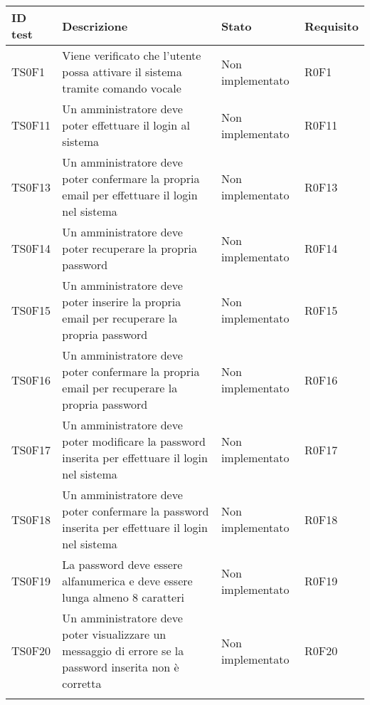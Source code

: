 \documentclass[../PianoDiQualifica.tex]{subfiles}
\begin{document}
	\begin{longtable}[c] { >{\centering\arraybackslash}p{2cm} p{7cm} >{\centering\arraybackslash}p{4cm} >{\centering\arraybackslash}p{2cm}}
		\toprule
		\centerline{\textbf{ID test}} & \centerline{\textbf{Descrizione}} & \centerline{\textbf{Stato}} & \centerline{\textbf{Requisito}}\\
			\midrule
			TS0F1 & Viene verificato che l'utente possa attivare il sistema tramite comando vocale & Non implementato & R0F1 \\ 
			\addlinespace[0.3em]
			\midrule
			\addlinespace[0.3em]
			TS0F11 & Un amministratore deve poter effettuare il login al sistema & Non implementato & R0F11 \\ 
			\addlinespace[0.3em]
			\midrule
			\addlinespace[0.3em]
			TS0F13 & Un amministratore deve poter confermare la propria email per effettuare il login nel sistema & Non implementato & R0F13 \\ 
			\addlinespace[0.3em]
			\midrule
			\addlinespace[0.3em]
			TS0F14 & Un amministratore deve poter recuperare la propria password & Non implementato & R0F14 \\
			\addlinespace[0.3em]
			\midrule
			\addlinespace[0.3em]
			TS0F15 & Un amministratore deve poter inserire la propria email per recuperare la propria password & Non implementato & R0F15 \\ 
			\addlinespace[0.3em]
			\midrule
			\addlinespace[0.3em]
			TS0F16 & Un amministratore deve poter confermare la propria email per recuperare la propria password	 & Non implementato & R0F16 \\ 
			\addlinespace[0.3em]
			\midrule
			\addlinespace[0.3em]
			TS0F17 & Un amministratore deve poter modificare la password inserita per effettuare il login nel sistema	 & Non implementato & R0F17 \\ 
			\addlinespace[0.3em]
			\midrule
			\addlinespace[0.3em]
			TS0F18 & Un amministratore deve poter confermare la password inserita per effettuare il login nel sistema	 & Non implementato & R0F18 \\ 
			\addlinespace[0.3em]
			\midrule
			\addlinespace[0.3em]
			TS0F19 & La password deve essere alfanumerica e deve essere lunga almeno 8 caratteri & Non implementato & R0F19 \\ 
			\addlinespace[0.3em]
			\midrule
			\addlinespace[0.3em]
			TS0F20 & Un amministratore deve poter visualizzare un messaggio di errore se la password inserita non è corretta & Non implementato & R0F20 \\ 
			\addlinespace[0.3em]

\end{longtable}
\end{document}
